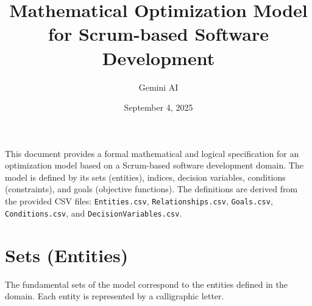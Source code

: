 \documentclass[11pt]{article}
\title{Mathematical Optimization Model for Scrum-based Software Development}
\author{Gemini AI}
\date{September 4, 2025}
\begin{document}
\maketitle

\tableofcontents
\newpage

This document provides a formal mathematical and logical specification for an optimization model based on a Scrum-based software development domain. The model is defined by its sets (entities), indices, decision variables, conditions (constraints), and goals (objective functions). The definitions are derived from the provided CSV files: \texttt{Entities.csv}, \texttt{Relationships.csv}, \texttt{Goals.csv}, \texttt{Conditions.csv}, and \texttt{DecisionVariables.csv}.

\section{Sets (Entities)}
The fundamental sets of the model correspond to the entities defined in the domain. Each entity is represented by a calligraphic letter.
\end{document}
